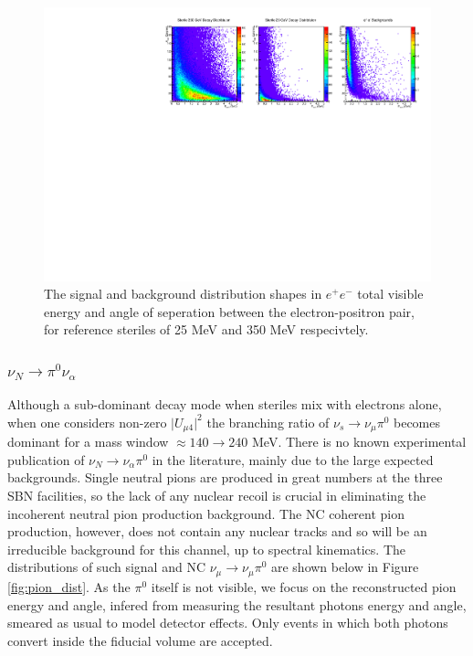 \documentclass[11pt, a4paper]{article}
\begin{document}
\begin{figure}[t]
\center
\includegraphics[width=1\textwidth,clip,trim=0 0 0 0]{figures/ee_dist.pdf}
\caption{\label{fig:ee_dist} The signal and background distribution shapes in $e^+e^-$  total visible energy and angle of seperation between the electron-positron pair, for reference steriles of 25 MeV and 350 MeV respecivtely.}

\end{figure}



\subsubsection{$\nu_N \rightarrow \pi^0 \nu_\alpha$}

Although a sub-dominant decay mode when steriles mix with electrons alone, when one considers non-zero $\vert U_{\mu4}\vert^2$ the branching ratio of $\nu_s
\rightarrow \nu_\mu \pi^0$ becomes dominant for a mass window $\approx 140 \rightarrow 240$ MeV. There is no known experimental publication of $\nu_N \rightarrow \nu_\alpha \pi^0$ in the literature, mainly due to the large expected backgrounds. Single neutral pions are produced in great numbers at the
three SBN facilities, so the lack of any nuclear recoil is crucial in eliminating the incoherent neutral pion production background. The NC coherent
pion production, however, does not contain any nuclear tracks and so will be an
irreducible background for this channel, up to spectral kinematics. The distributions of such signal and NC $\nu_\mu\rightarrow \nu_\mu \pi^0$ are shown below in Figure \ref{fig:pion_dist}. As the $\pi^0$ itself is not visible, we focus on the reconstructed pion energy and angle, infered from measuring the resultant photons energy and angle, smeared as usual to model detector effects. Only events in which both photons convert inside the fiducial volume are accepted. 
\end{document}
